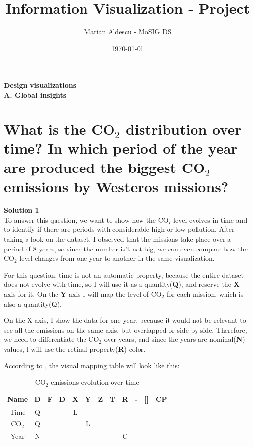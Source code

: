 \documentclass{article}
\title{Information Visualization - Project\vspace{-0.8em}}
\author{Marian Aldescu - MoSIG DS}
\date{\today}
\begin{document}
\maketitle



\textbf{\Large{Design visualizations}}\\

\textbf{\Large{A. Global insights}}\\


\section{What is the CO$_2$ distribution over time? In which period of the year are produced the biggest CO${_2}$ emissions by Westeros missions?}

\large{\textbf{Solution 1}}\\
To answer this question, we want to show how the CO${_2}$ level evolves in time and to identify if there are periods with considerable high or low pollution. After taking a look on the dataset, I observed that the missions take place over a period of 8 years, so since the number is't not big, we can even compare how the CO${_2}$ level changes from one year to another in the same visualization.

For this question, time is not an automatic property, because the entire dataset does not evolve with time, so I will use it as a quantity(\textbf{Q}), and reserve the \textbf{X} axis for it. On the \textbf{Y} axis I will map the level of CO${_2}$ for each mission, which is also a quantity(\textbf{Q}).

On the X axis, I show the data for one year, because it would not be relevant to see all the emissions on the same axis, but overlapped or side by side. Therefore, we need to differentiate the CO${_2}$ over years, and since the years are nominal(\textbf{N}) values, I will use the retinal property(\textbf{R}) color.

According to \cite{mackinlay}, the visual mapping table will look like this:\\


\begin{table}[h!]
\begin{center}
	\begin{tabular}{|c | c | c | c || c | c | c | c | c| c| c || c|} 
		\hline
		Name & D & F & D\textquotesingle  & X & Y & Z & T & R & -& [] & CP \\ [0.5ex] 
		\hline\hline
		Time  & Q &  &  &  L &   &   &   &   &   &   &   \\ [0.5ex] 
		\hline
		CO${_2}$  & Q &  &  &  & L  &   &   &   &   &   &   \\ [0.5ex] 
		\hline
		Year  & N &  &  &  &   &   &   & C  &   &   &   \\ [0.5ex] 
		\hline
	\end{tabular}
	\caption{CO${_2}$ emissions evolution  over time}
	\label{table:1}
\end{center}
\end{table}
\end{document}
